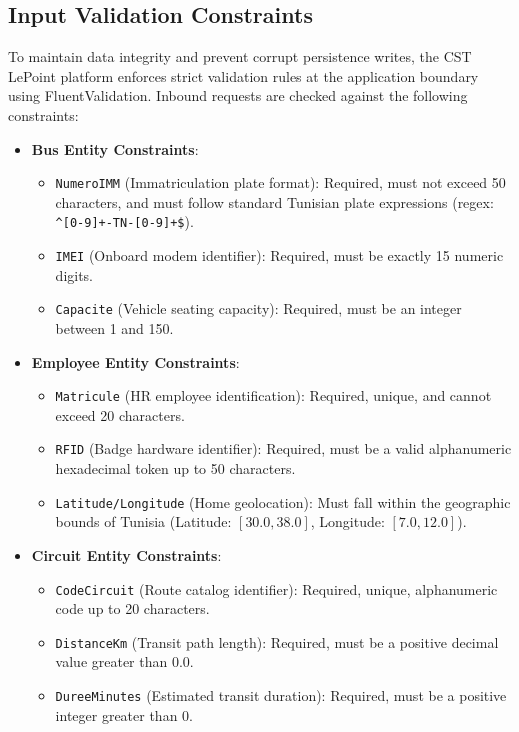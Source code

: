\subsection{Input Validation Constraints}

To maintain data integrity and prevent corrupt persistence writes, the CST LePoint platform enforces strict validation rules at the application boundary using FluentValidation. Inbound requests are checked against the following constraints:

\begin{itemize}
  \item \textbf{Bus Entity Constraints}:
  \begin{itemize}
    \item \texttt{NumeroIMM} (Immatriculation plate format): Required, must not exceed 50 characters, and must follow standard Tunisian plate expressions (regex: \verb|^[0-9]+-TN-[0-9]+$|).
    \item \texttt{IMEI} (Onboard modem identifier): Required, must be exactly 15 numeric digits.
    \item \texttt{Capacite} (Vehicle seating capacity): Required, must be an integer between 1 and 150.
  \end{itemize}

  \item \textbf{Employee Entity Constraints}:
  \begin{itemize}
    \item \texttt{Matricule} (HR employee identification): Required, unique, and cannot exceed 20 characters.
    \item \texttt{RFID} (Badge hardware identifier): Required, must be a valid alphanumeric hexadecimal token up to 50 characters.
    \item \texttt{Latitude/Longitude} (Home geolocation): Must fall within the geographic bounds of Tunisia (Latitude: $[30.0, 38.0]$, Longitude: $[7.0, 12.0]$).
  \end{itemize}

  \item \textbf{Circuit Entity Constraints}:
  \begin{itemize}
    \item \texttt{CodeCircuit} (Route catalog identifier): Required, unique, alphanumeric code up to 20 characters.
    \item \texttt{DistanceKm} (Transit path length): Required, must be a positive decimal value greater than 0.0.
    \item \texttt{DureeMinutes} (Estimated transit duration): Required, must be a positive integer greater than 0.
  \end{itemize}
\end{itemize}

